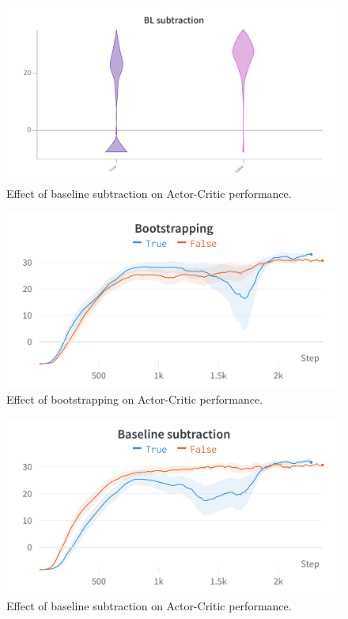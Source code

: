 \documentclass{article}
\begin{document}
\begin{figure}[htbp]
    \centering
    \includegraphics[width=\linewidth]{figs/baseline-V.png}
    \caption{Effect of baseline subtraction on Actor-Critic performance.}
    \label{fig:baselinesub-v}
\end{figure}

\begin{figure}[htbp]
    \centering
    \includegraphics[width=\linewidth]{figs/bootstrap-R.png}
    \caption{Effect of bootstrapping on Actor-Critic performance.}
    \label{fig:bootstrap-r}
\end{figure}

\begin{figure}[htbp]
    \centering
    \includegraphics[width=\linewidth]{figs/baseline-R.png}
    \caption{Effect of baseline subtraction on Actor-Critic performance.}
    \label{fig:baselinesub-r}
\end{figure}
\end{document}
